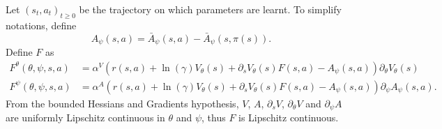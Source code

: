 Let $(s_t, a_t)_{t\geq 0}$ be the trajectory on which parameters are
learnt. To simplify notations, define
\begin{equation}
	A_\psi(s, a) = \bar{A}_\psi(s, a) - \bar{A}_\psi(s, \pi(s)).
\end{equation}
Define $F$ as
\begin{align}
	F^\theta(\theta, \psi, s, a) &= \alpha^V (r(s, a) + \ln(\gamma) V_\theta(s) + \partial_s V_\theta(s) F(s, a) - A_\psi(s, a))\partial_\theta V_\theta(s)\\
	F^\psi(\theta, \psi, s, a) &= \alpha^A (r(s, a) + \ln(\gamma) V_\theta(s) + \partial_s V_\theta(s) F(s, a) - A_\psi(s, a))\partial_\psi A_\psi(s, a).
\end{align}
From the bounded Hessians and Gradients hypothesis, $V$, $A$, $\partial_s V$,
$\partial_\theta V$ and $\partial_\psi A$ are uniformly Lipschitz continuous in
$\theta$ and $\psi$, thus $F$ is Lipschitz continuous.

